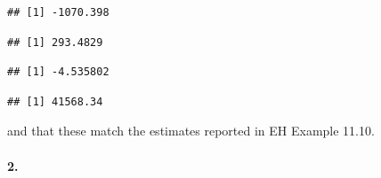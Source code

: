 \documentclass[
]{article}
\newenvironment{Shaded}{\begin{snugshade}}{\end{snugshade}}
\newcommand{\DecValTok}[1]{\textcolor[rgb]{0.00,0.00,0.81}{#1}}
\newcommand{\KeywordTok}[1]{\textcolor[rgb]{0.13,0.29,0.53}{\textbf{#1}}}
\newcommand{\NormalTok}[1]{#1}
\newcommand{\OperatorTok}[1]{\textcolor[rgb]{0.81,0.36,0.00}{\textbf{#1}}}
\newcommand{\StringTok}[1]{\textcolor[rgb]{0.31,0.60,0.02}{#1}}
\begin{document}
\begin{Shaded}
\end{Shaded}

\begin{verbatim}
## [1] -1070.398
\end{verbatim}

\begin{Shaded}
\end{Shaded}

\begin{verbatim}
## [1] 293.4829
\end{verbatim}

\begin{Shaded}
\end{Shaded}

\begin{verbatim}
## [1] -4.535802
\end{verbatim}

\begin{Shaded}
\end{Shaded}

\begin{verbatim}
## [1] 41568.34
\end{verbatim}

and that these match the estimates reported in EH Example 11.10.

\hypertarget{section-51}{%
\paragraph{\texorpdfstring{\textbf{2.}}{2.}}\label{section-51}}
\end{document}
